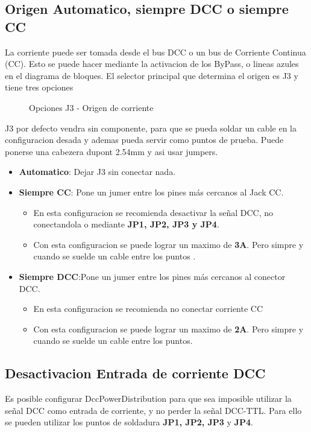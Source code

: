 \subsection{Origen Automatico, siempre DCC o siempre CC}
La corriente puede ser tomada desde el bus DCC o un bus de Corriente Continua (CC).
Esto se puede hacer mediante la activacion de los ByPass, o lineas azules en el diagrama
de bloques. El selector principal que determina el origen es J3 y tiene tres opciones

\begin{figure}[H]
    \centering
    
    \caption{Opciones J3 - Origen de corriente}
    \label{fig:VccSelection}
\end{figure}

J3 por defecto vendra sin componente, para que se pueda soldar un cable en la configuracion desada
y ademas pueda servir como puntos  de prueba. Puede ponerse una cabezera dupont 2.54mm y asi usar 
jumpers.

\begin{itemize}
    \item \textbf{Automatico}: Dejar J3 sin conectar nada.
    \item \textbf{Siempre CC}: Pone un jumer entre los pines más cercanos al Jack CC.
    \begin{itemize}
        \item En esta configuracion se recomienda desactivar la señal DCC, no conectandola
 o mediante \textbf{JP1, JP2, JP3 y JP4}.
        \item Con esta configuracion se puede lograr un maximo de \textbf{3A}. Pero simpre y
cuando se suelde un cable entre los puntos .             
    \end{itemize}
     \item \textbf{Siempre DCC}:Pone un jumer entre los pines más cercanos al conector DCC.
     \begin{itemize}
         \item En esta configuracion se recomienda no conectar corriente CC
         \item Con esta configuracion se puede lograr un maximo de \textbf{2A}. Pero simpre y
 cuando se suelde un cable entre los puntos.             
     \end{itemize}
\end{itemize}

\subsection{Desactivacion Entrada de corriente DCC}
Es posible configurar DccPowerDistribution para que sea imposible utilizar la señal DCC como
entrada de corriente, y no perder la señal DCC-TTL. Para ello se pueden utilizar los puntos
de soldadura \textbf{JP1, JP2, JP3} y \textbf{JP4}.


